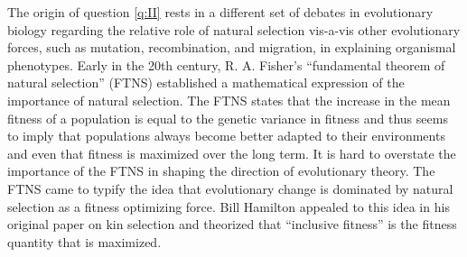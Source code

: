 \documentclass[11pt]{article}
\begin{document}
The origin of question \ref{q:II} rests in a different set of debates in evolutionary biology regarding the relative role of natural selection vis-a-vis other evolutionary forces, such as mutation, recombination, and migration, in explaining organismal phenotypes. Early in the 20th century, R. A. Fisher's ``fundamental theorem of natural selection'' (FTNS) \cite{Fisher:1930} established a mathematical expression of the importance of natural selection. The FTNS states that the increase in the mean fitness of a population is equal to the genetic variance in fitness and thus seems to imply that populations always become better adapted to their environments and even that fitness is maximized over the long term. It is hard to overstate the importance of the FTNS in shaping the direction of evolutionary theory. The FTNS came to typify the idea that evolutionary change is dominated by natural selection as a fitness optimizing force. Bill Hamilton appealed to this idea in his original paper on kin selection \cite{Hamilton:1964} and theorized that ``inclusive fitness'' is the fitness quantity that is maximized.
\end{document}
